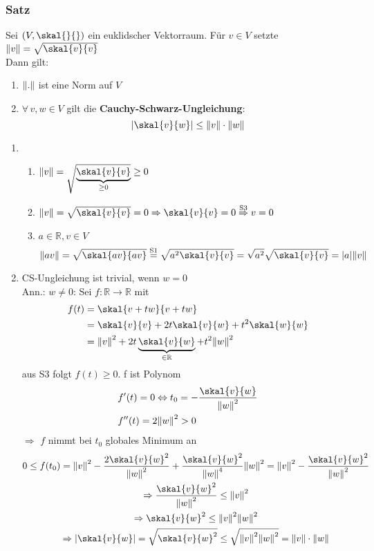 \subsubsection[Cauchy-Schwarz-Ungleichung]{Satz} %
\label{ssub:satz}
Sei $(V,\skal{}{})$ ein euklidscher Vektorraum. Für $v \in V$ setzte $\norm{v}=\sqrt{\skal{v}{v}}$ \\ Dann gilt:
\begin{enumerate}
	\item $\norm{.}$ ist eine Norm auf $ V$ 
	\item $\forall\, v,w \in V$ gilt die {\bfseries Cauchy-Schwarz-Ungleichung}:
	\[
		|\skal{v}{w}| \leq \norm{v} \cdot \norm{w}
	\]  
\end{enumerate}
\begin{enumerate}
	\item \begin{enumerate}[N1:]
		\item $\norm{v}=\sqrt{\underset{\geq 0}{\underbrace{\skal{v}{v}}}} \geq  0$
		\item $\norm{v}=\sqrt{\skal{v}{v}}=0 \Rightarrow \skal{v}{v}=0 \stackrel{\text{S3}}{\Rightarrow} v=0$ 
		\item $a \in \mathbb{R} , v \in V$ \[
			\norm{av}=\sqrt{\skal{av}{av}} \stackrel{\text{S1}}{=} \sqrt{a^2 \skal{v}{v}} = \sqrt{a^2} \sqrt{\skal{v}{v}} = \abs{a} \norm{v}
		\] 
	\end{enumerate}
	\item CS-Ungleichung ist trivial, wenn $w=0$ \\
	Ann.: $w \neq 0$: Sei $f:\mathbb{R} \to \mathbb{R} $ mit
	\begin{align*}
		f(t) &=\skal{v+tw}{v+tw} \\
		& = \skal{v}{v} +2t \skal{v}{w} + t^2 \skal{w}{w} \\
		& = \norm{v}^2+ 2t \underbrace{\skal{v}{w}}_{\in \mathbb{R}} + t^2 \norm{w}^2 
	\end{align*} 
	aus S3 folgt $f(t)\geq 0$. f ist Polynom
	\begin{align*}
		&f'(t)=0 \Leftrightarrow t_0 = - \frac{\skal{v}{w}}{\norm{w}^2} \\
		&f''(t)=2 \norm{w}^2 > 0
	\end{align*}
 $\Rightarrow$ $f$ nimmt bei $t_0$ globales Minimum an
 \begin{gather*}
 	0 \leq f(t_0)=\norm{v}^2 - \frac{2 \skal{v}{w}^2}{\norm{w}^2} + \frac{\skal{v}{w}^2}{\norm{w}^4} \norm{w}^2 = \norm{v}^2 - \frac{\skal{v}{w}^2}{\norm{w}^2} \\
	\Rightarrow \frac{\skal{v}{w}^2}{\norm{w}^2} \leq \norm{v}^2 \\ \Rightarrow \skal{v}{w}^2 \leq \norm{v}^2 \norm{w}^2 \\
	\Rightarrow \abs{\skal{v}{w}} = \sqrt{\skal{v}{w}^2} \leq \sqrt{\norm{v}^2 \norm{w}^2} = \norm{v} \cdot \norm{w}
 \end{gather*}
 \bewende
\end{enumerate}

